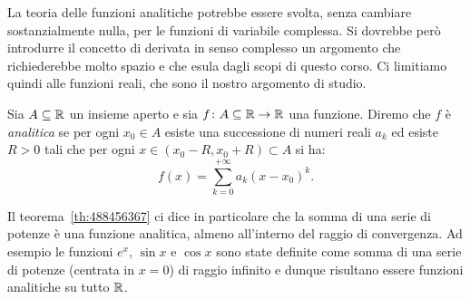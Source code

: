 La teoria delle funzioni analitiche potrebbe essere svolta, senza cambiare
sostanzialmente nulla, per le funzioni di variabile complessa.
Si dovrebbe però introdurre il concetto di derivata in senso complesso
un argomento che richiederebbe molto spazio e che esula dagli scopi di questo corso.
Ci limitiamo quindi alle funzioni reali, che sono il nostro argomento di studio.

\begin{definition}
Sia $A\subseteq \mathbb R$ un insieme aperto e sia
$f\colon A\subseteq \mathbb R \to \mathbb R$ una funzione. Diremo che
$f$ è \emph{analitica} se per ogni $x_0\in A$ esiste una successione
di numeri reali $a_k$ ed esiste $R>0$ tali che per ogni $x\in (x_0-R,x_0+R)\subset A$
si ha:
\[
  f(x) = \sum_{k=0}^{+\infty} a_k (x-x_0)^k.
\]
\end{definition}

Il teorema~\ref{th:488456367} ci dice in particolare che la somma di una serie
di potenze è una funzione analitica, almeno all'interno del raggio di convergenza.
Ad esempio le funzioni $e^x$, $\sin x$ e $\cos x$ sono state definite
come somma di una serie di potenze (centrata in $x=0$) di raggio infinito
e dunque risultano essere funzioni analitiche su tutto $\mathbb R$.

